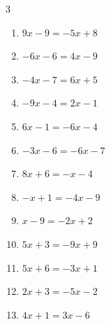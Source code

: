 \begin{multicols}{3}
\begin{enumerate}

  \item $9x-9=-5x+8$


  \item $-6x-6=4x-9$


  \item $-4x-7=6x+5$


  \item $-9x-4=2x-1$


  \item $6x-1=-6x-4$


  \item $-3x-6=-6x-7$


\columnbreak %

\resetques

  \item $8x+6=-x-4$


  \item $-x+1=-4x-9$


  \item $x-9=-2x+2$


  \item $5x+3=-9x+9$


  \item $5x+6=-3x+1$


  \item $2x+3=-5x-2$


  \item $4x+1=3x-6$


\end{enumerate}
\end{multicols}
